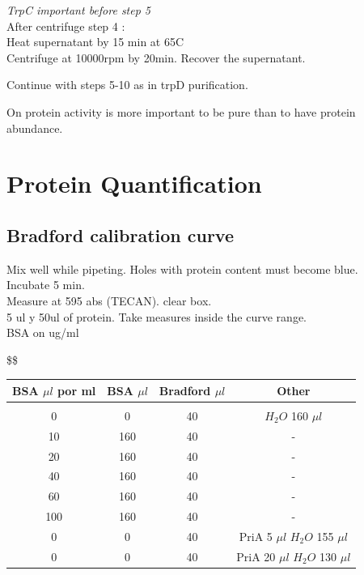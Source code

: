 \documentclass[12pt,twoside]{reedthesis}
\begin{document}
{  \emph{TrpC important before step 5}\\
  After centrifuge step 4 :\\
  Heat supernatant by 15 min at 65C\\
  Centrifuge at 10000rpm by 20min. Recover the supernatant.
  
  Continue with steps 5-10 as in trpD purification.
  
  On protein activity is more important to be pure than to have protein
  abundance.
  
  \section{Protein Quantification}\label{protein-quantification}
  
  \subsection{Bradford calibration
  curve}\label{bradford-calibration-curve}
  
  Mix well while pipeting. Holes with protein content must become blue.\\
  Incubate 5 min.\\
  Measure at 595 abs (TECAN). clear box.\\
  5 ul y 50ul of protein. Take measures inside the curve range.\\
  BSA on ug/ml
  
  \$\$ \label{ScoD11_A}
  
  \begin{tabular}{c c c c}
  \hline 
  BSA $\mu l$ por ml & BSA $\mu l$ & Bradford $\mu l$ & Other \\ [1ex]
  \hline \\ [-1.5ex]  
  0                & 0      & 40 & $H_2O$ 160 $\mu l$   \\ [1 ex]
  10               & 160    & 40 &    -                 \\ [1 ex]
  20               & 160    & 40 & -                    \\ [1 ex]
  40               & 160    & 40 & -                    \\ [1 ex]
  60               & 160    & 40 &-                     \\ [1 ex]
  100              & 160    & 40 & -                    \\ [1 ex]
  0                &   0    & 40 &  PriA 5 $\mu l$   $H_2O$ 155 $\mu l$   \\ [1 ex]
  0                &   0    & 40 &  PriA 20 $\mu l$   $H_2O$ 130 $\mu l$  \\ [1 ex]
  

\end{tabular}}
\end{document}
